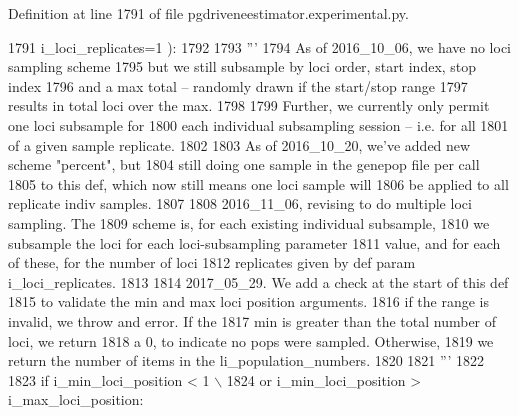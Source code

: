 Definition at line 1791 of file pgdriveneestimator.\+experimental.\+py.


\begin{DoxyCode}
1791                         i\_loci\_replicates=1 ):
1792         
1793     \textcolor{stringliteral}{'''}
1794 \textcolor{stringliteral}{    As of 2016\_10\_06, we have no loci sampling scheme}
1795 \textcolor{stringliteral}{    but we still subsample by loci order, start index, stop index}
1796 \textcolor{stringliteral}{    and a max total -- randomly drawn if the start/stop range}
1797 \textcolor{stringliteral}{    results in total loci over the max. }
1798 \textcolor{stringliteral}{}
1799 \textcolor{stringliteral}{    Further, we currently only permit one loci subsample for}
1800 \textcolor{stringliteral}{    each individual subsampling session -- i.e. for all }
1801 \textcolor{stringliteral}{    of a given sample replicate.}
1802 \textcolor{stringliteral}{}
1803 \textcolor{stringliteral}{    As of 2016\_10\_20, we've added new scheme "percent", but}
1804 \textcolor{stringliteral}{    still doing one sample in the genepop file per call}
1805 \textcolor{stringliteral}{    to this def, which now still means one loci sample will}
1806 \textcolor{stringliteral}{    be applied to all replicate indiv samples.}
1807 \textcolor{stringliteral}{}
1808 \textcolor{stringliteral}{    2016\_11\_06, revising to do multiple loci sampling.  The}
1809 \textcolor{stringliteral}{    scheme is, for each existing individual subsample,}
1810 \textcolor{stringliteral}{    we subsample the loci for each loci-subsampling parameter}
1811 \textcolor{stringliteral}{    value, and for each of these, for the number of loci}
1812 \textcolor{stringliteral}{    replicates given by def param i\_loci\_replicates.}
1813 \textcolor{stringliteral}{}
1814 \textcolor{stringliteral}{    2017\_05\_29.  We add a check at the start of this def}
1815 \textcolor{stringliteral}{    to validate the min and max loci position arguments.}
1816 \textcolor{stringliteral}{    if the range is invalid, we throw and error.  If the}
1817 \textcolor{stringliteral}{    min is greater than the total number of loci, we return}
1818 \textcolor{stringliteral}{    a 0, to indicate no pops were sampled.  Otherwise, }
1819 \textcolor{stringliteral}{    we return the number of items in the li\_population\_numbers.}
1820 \textcolor{stringliteral}{}
1821 \textcolor{stringliteral}{    '''}
1822 
1823     \textcolor{keywordflow}{if} i\_min\_loci\_position < 1  \(\backslash\)
1824             \textcolor{keywordflow}{or} i\_min\_loci\_position > i\_max\_loci\_position:

\end{DoxyCode}
